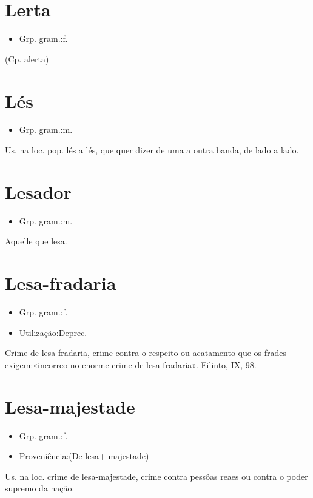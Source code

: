 \section{Lerta}
\begin{itemize}
\item {Grp. gram.:f.}
\end{itemize}
(Cp. \textunderscore alerta\textunderscore )
\section{Lés}
\begin{itemize}
\item {Grp. gram.:m.}
\end{itemize}
Us. na loc. pop. \textunderscore lés a lés\textunderscore , que quer dizer \textunderscore de uma a outra banda\textunderscore , \textunderscore de lado a lado\textunderscore .
\section{Lesador}
\begin{itemize}
\item {Grp. gram.:m.}
\end{itemize}
Aquelle que lesa.
\section{Lesa-fradaria}
\begin{itemize}
\item {Grp. gram.:f.}
\end{itemize}
\begin{itemize}
\item {Utilização:Deprec.}
\end{itemize}
\textunderscore Crime de lesa-fradaria\textunderscore , crime contra o respeito ou acatamento que os frades exigem:«\textunderscore incorreo no enorme crime de lesa-fradaria\textunderscore ». Filinto, IX, 98.
\section{Lesa-majestade}
\begin{itemize}
\item {Grp. gram.:f.}
\end{itemize}
\begin{itemize}
\item {Proveniência:(De \textunderscore lesa\textunderscore  + \textunderscore majestade\textunderscore )}
\end{itemize}
Us. na loc. \textunderscore crime de lesa-majestade\textunderscore , crime contra pessôas reaes ou contra o poder supremo da nação.
